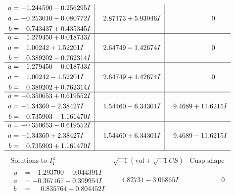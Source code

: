 \documentclass[1p]{elsarticle_modified}
\theoremstyle{definition}
\newcommand{\I}{\sqrt{-1}}
\begin{document}
$$\begin{array}{c|c|c}
\begin{aligned}
u &= -1.244590 - 0.256295 I \\
a &= -0.253010 - 0.080772 I \\
b &= -0.743437 + 0.435345 I\end{aligned}
 & \phantom{-}2.87173 + 5.93046 I & \phantom{-0.000000 } 0 \\ \hline\begin{aligned}
u &= \phantom{-}1.279450 + 0.018733 I \\
a &= \phantom{-}1.00242 + 1.52201 I \\
b &= \phantom{-}0.389202 - 0.762314 I\end{aligned}
 & \phantom{-}2.64749 - 1.42674 I & \phantom{-0.000000 } 0 \\ \hline\begin{aligned}
u &= \phantom{-}1.279450 - 0.018733 I \\
a &= \phantom{-}1.00242 - 1.52201 I \\
b &= \phantom{-}0.389202 + 0.762314 I\end{aligned}
 & \phantom{-}2.64749 + 1.42674 I & \phantom{-0.000000 } 0 \\ \hline\begin{aligned}
u &= -0.350653 + 0.619552 I \\
a &= -1.34360 - 2.38427 I \\
b &= \phantom{-}0.735903 - 1.161470 I\end{aligned}
 & \phantom{-}1.54460 - 6.34301 I & \phantom{-}9.4689 + 11.6215 I \\ \hline\begin{aligned}
u &= -0.350653 - 0.619552 I \\
a &= -1.34360 + 2.38427 I \\
b &= \phantom{-}0.735903 + 1.161470 I\end{aligned}
 & \phantom{-}1.54460 + 6.34301 I & \phantom{-}9.4689 - 11.6215 I\\
 \hline 
 \end{array}$$\newpage$$\begin{array}{c|c|c}  
\text{Solutions to }I^u_{1}& \I (\text{vol} + \sqrt{-1}CS) & \text{Cusp shape}\\
 \hline 
\begin{aligned}
u &= -1.293700 + 0.044391 I \\
a &= -0.367167 - 0.309954 I \\
b &= \phantom{-}0.835764 - 0.804452 I\end{aligned}
 & \phantom{-}4.82731 - 3.06865 I & \phantom{-0.000000 } 0 \\ \hline\begin{aligned}

\end{aligned}
\end{array}$$
\end{document}
